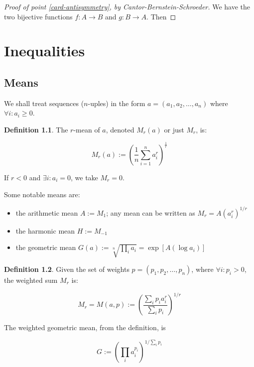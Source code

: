 \documentclass[12pt,a4paper]{report}
\numberwithin{equation}{section}
\theoremstyle{definition}
\newtheorem{definition}{Definition}[section]
\theoremstyle{remark}
\begin{document}
\begin{proof}[Proof of point \ref{card-antisymmetry}, by Cantor-Bernstein-Schroeder]
We have the two bijective functions $f : A\rightarrow B$ and $g : B\rightarrow A$. Then 
\end{proof}

\chapter{Inequalities}

\section{Means}

We shall treat sequences ($n$-uples) in the form $a = (a_1, a_2, \dots , a_n)$ where $\forall i: a_i \geq 0$.

\begin{definition}
The $r$-mean of $a$, denoted $M_r (a)$ or just $M_r$, is:

\begin{equation}
M_r (a) := \left( \frac{1}{n} \displaystyle\sum _{i=1}^n a_i^r \right) ^{\frac{1}{r}}
\end{equation}

If $r<0$ and $\exists i : a_i = 0$, we take $M_r = 0$.
\end{definition}

Some notable means are:

\begin{itemize}
\item the arithmetic mean $A := M_1$; any mean can be written as $M_r = A (a_i^r )^{1/r}$
\item the harmonic mean $H := M_{-1}$
\item the geometric mean $G (a ) := \sqrt[n]{\prod_i a_i} = \exp [ A (\log a_i) ]$
\end{itemize}

\begin{definition}
Given the set of weights $p = (p_1, p_2, \dots, p_n)$, where $\forall i: p_i>0$, the weighted sum $M_r$ is:

\begin{equation}
M_r = M (a, p ) :=\left( \frac{\displaystyle \sum_i p_i a_i^r}{\displaystyle\sum_i p_i}\right)^{1/r}
\end{equation}

The weighted geometric mean, from the definition, is

\begin{equation}
G := \left( \prod_i a_i ^{p_i} \right) ^{1/\sum_i p_i}
\end{equation}

\end{definition}
\end{document}
